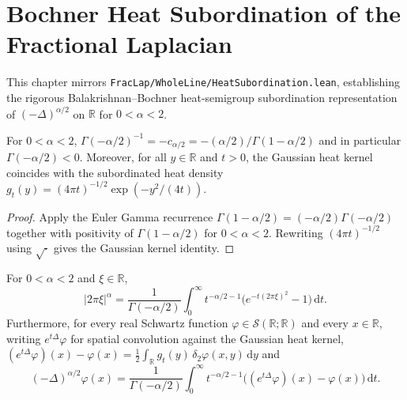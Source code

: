 \chapter{Bochner Heat Subordination of the Fractional Laplacian}

This chapter mirrors \texttt{FracLap/WholeLine/HeatSubordination.lean}, establishing the rigorous Balakrishnan--Bochner heat-semigroup subordination representation of $(-\Delta)^{\alpha/2}$ on $\mathbb{R}$ for $0 < \alpha < 2$.

\begin{lemma}\label{lem:heat_sub_constants}
\leanok
For $0 < \alpha < 2$, $\Gamma(-\alpha/2)^{-1} = -c_{\alpha/2} = -(\alpha/2)/\Gamma(1 - \alpha/2)$ and in particular $\Gamma(-\alpha/2) < 0$. Moreover, for all $y \in \mathbb{R}$ and $t > 0$, the Gaussian heat kernel coincides with the subordinated heat density $g_t(y) = (4\pi t)^{-1/2} \exp(-y^2 / (4t))$.
\end{lemma}

\begin{proof}
\leanok
Apply the Euler Gamma recurrence $\Gamma(1 - \alpha/2) = (-\alpha/2)\Gamma(-\alpha/2)$ together with positivity of $\Gamma(1 - \alpha/2)$ for $0 < \alpha < 2$. Rewriting $(4\pi t)^{-1/2}$ using $\sqrt{\cdot}$ gives the Gaussian kernel identity.
\end{proof}

\begin{theorem}\label{thm:heat_subordination}
\leanok
For $0 < \alpha < 2$ and $\xi \in \mathbb{R}$,
\[
  \lvert 2\pi\xi \rvert^\alpha = \frac{1}{\Gamma(-\alpha/2)} \int_0^\infty t^{-\alpha/2 - 1} \bigl(e^{-t(2\pi\xi)^2} - 1\bigr)\, \mathrm{d}t.
\]
Furthermore, for every real Schwartz function $\varphi \in \mathcal{S}(\mathbb{R}; \mathbb{R})$ and every $x \in \mathbb{R}$, writing $e^{t\Delta}\varphi$ for spatial convolution against the Gaussian heat kernel, $(e^{t\Delta}\varphi)(x) - \varphi(x) = \frac{1}{2}\int_{\mathbb{R}} g_t(y)\,\delta_2 \varphi(x, y)\, \mathrm{d}y$ and
\[
  (-\Delta)^{\alpha/2} \varphi(x) = \frac{1}{\Gamma(-\alpha/2)} \int_0^\infty t^{-\alpha/2 - 1} \bigl( (e^{t\Delta} \varphi)(x) - \varphi(x) \bigr)\, \mathrm{d}t.
\]
\end{theorem}

